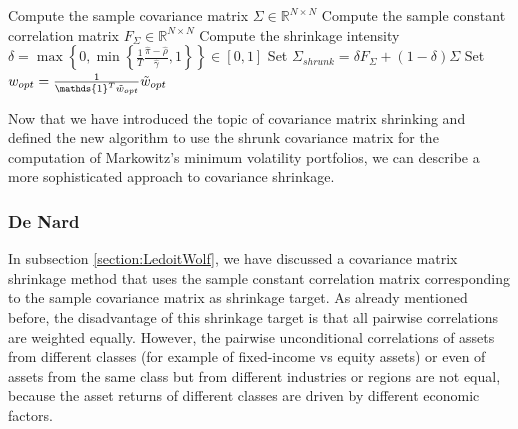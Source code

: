     	\begin{algorithm}[H]
            \SetAlgoLined
            
            Compute the sample covariance matrix $\Sigma \in \mathbb{R}^{N \times N}$\;
            Compute the sample constant correlation matrix $F_{\Sigma} \in \mathbb{R}^{N \times N}$\;
            Compute the shrinkage intensity $\delta = \max \left\{ 0, \min \left\{ \frac{1}{T} \frac{\hat{\pi} - \hat{\rho}}{\hat{\gamma}}, 1 \right\} \right\} \in [0,1]$\;
            Set $\Sigma_{shrunk} = \delta F_{\Sigma} + (1 - \delta) \Sigma$\;
            Set $w_{opt} = \frac{1}{\mathds{1}^T \Tilde{w}_{opt}} \Tilde{w}_{opt}$\;
            \caption{Markowitz Minimum Variance Portfolio Computation with Ledoit and Wolf's Covariance Matrix Shrinkage}
        \end{algorithm}
        
        Now that we have introduced the topic of covariance matrix shrinking and defined the new algorithm to use the shrunk covariance matrix for the computation of Markowitz's minimum volatility portfolios, we can describe a more sophisticated approach to covariance shrinkage.
    
    \subsubsection{De Nard}\label{section:DeNard}
        
        In subsection \ref{section:LedoitWolf}, we have discussed a covariance matrix shrinkage method that uses the sample constant correlation matrix corresponding to the sample covariance matrix as shrinkage target. As already mentioned before, the disadvantage of this shrinkage target is that all pairwise correlations are weighted equally. However, the pairwise unconditional correlations of assets from different classes (for example of fixed-income vs equity assets) or even of assets from the same class but from different industries or regions are not equal, because the asset returns of different classes are driven by different economic factors.
        
